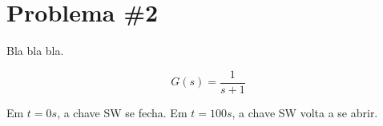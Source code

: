 \section*{Problema \#2}

Bla bla bla.


\begin{equation}
    G(s) = \frac{1}{s+1}
\end{equation}


Em $t = 0s$, a chave SW se fecha.
Em $t = 100s$, a chave SW volta a se abrir.